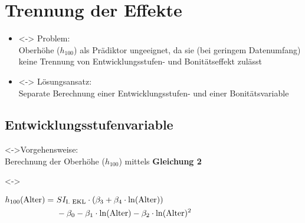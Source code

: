 \section{Trennung der Effekte}

\begin{frame}[c]
  \begin{itemize}
  \item<\theFirstElement-> Problem: \\
    Oberhöhe (\(h_{100}\)) als Prädiktor ungeeignet, da sie (bei geringem Datenumfang) keine Trennung von Entwicklungsstufen- und Bonitätseffekt zulässt
  \item<\theFirstElement-> Lösungsansatz: \\
    Separate Berechnung einer Entwicklungsstufen- und einer Bonitätsvariable
  \end{itemize}
\end{frame}

\subsection{Entwicklungsstufenvariable}

\begin{frame}[c]
  \visible<\theFirstElement->{Vorgehensweise: \\
  Berechnung der Oberhöhe (\(h_{100}\)) mittels \textbf{Gleichung 2}}
  
    \visible<\theFirstElement->{\begin{center}
      \begin{minipage}{0.665\linewidth}
        \centerline{\(\begin{aligned}[t]h_{100}(\text{Alter}) =~ &SI_{\text{I. EKL}} \cdot (\beta_3 + \beta_4 \cdot \ln(\text{Alter})) \\ &- \beta_0 - \beta_1 \cdot \ln(\text{Alter}) - \beta_2 \cdot \ln(\text{Alter})^2{}\end{aligned}\)}
        \vspace{\captiondistance}
      \end{minipage}
    \end{center}}
\end{frame}

